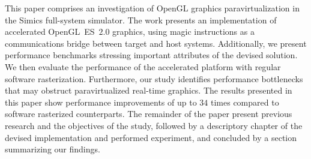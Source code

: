 This paper comprises an investigation of OpenGL graphics paravirtualization in the Simics full-system simulator.
The work presents an implementation of accelerated OpenGL~ES~$2.0$ graphics, using magic instructions as a communications bridge between target and host systems.
Additionally, we present performance benchmarks stressing important attributes of the devised solution.
We then evaluate the performance of the accelerated platform with regular software rasterization.
Furthermore, our study identifies performance bottlenecks that may obstruct paravirtualized real-time graphics.
The results presented in this paper show performance improvements of up to $34$ times compared to software rasterized counterparts.
The remainder of the paper present previous research and the objectives of the study, followed by a descriptory chapter of the devised implementation and performed experiment, and concluded by a section summarizing our findings.
